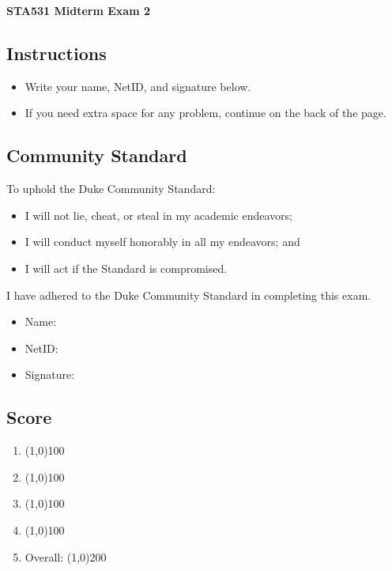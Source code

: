 \documentclass[12pt]{article}
\begin{document}
\begin{center}
\large\textbf{STA531 Midterm Exam 2}
\end{center}

\small

\subsection*{Instructions}
\begin{itemize}
    \item Write your name, NetID, and signature below.
    \item If you need extra space for any problem, continue on the back of the page.
\end{itemize}

\subsection*{Community Standard}
To uphold the Duke Community Standard:
\begin{itemize}
\item I will not lie, cheat, or steal in my academic endeavors;
\item I will conduct myself honorably in all my endeavors; and
\item I will act if the Standard is compromised.
\end{itemize}
I have adhered to the Duke Community Standard in completing this exam.

\vspace{1em}
\begin{itemize}
    \setlength\itemsep{1em}
    \item[] Name: \hrulefill
    \item[] NetID: \hrulefill
    \item[] Signature: \hrulefill
\end{itemize}

\subsection*{Score}

\vspace{1em}
\begin{enumerate}
    \setlength\itemsep{1em}
    \item \line(1,0){100}
    \item \line(1,0){100}
    \item \line(1,0){100}
    \item \line(1,0){100}
        \vspace{1em}
    \item[] Overall: \line(1,0){200}
\end{enumerate}
\end{document}
